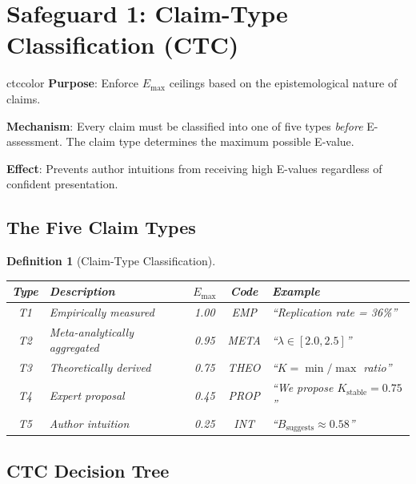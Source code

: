 \documentclass[11pt,a4paper]{article}
\newtheorem{definition}{Definition}[section]
\theoremstyle{remark}
\begin{document}
\section{Safeguard 1: Claim-Type Classification (CTC)}
\label{sec:ctc}

\begin{safeguardbox}{ctccolor}
\textbf{Purpose}: Enforce $E_{\max}$ ceilings based on the epistemological nature of claims.

\textbf{Mechanism}: Every claim must be classified into one of five types \textit{before} E-assessment. The claim type determines the maximum possible E-value.

\textbf{Effect}: Prevents author intuitions from receiving high E-values regardless of confident presentation.
\end{safeguardbox}

\subsection{The Five Claim Types}

\begin{definition}[Claim-Type Classification]
\label{def:ctc}
\begin{center}
\begin{tabular}{clccp{4.5cm}}
\toprule
\textbf{Type} & \textbf{Description} & \textbf{$E_{\max}$} & \textbf{Code} & \textbf{Example} \\
\midrule
T1 & Empirically measured & 1.00 & EMP & ``Replication rate = 36\%'' \\
T2 & Meta-analytically aggregated & 0.95 & META & ``$\lambda \in [2.0, 2.5]$'' \\
T3 & Theoretically derived & 0.75 & THEO & ``$K = \min/\max$ ratio'' \\
T4 & Expert proposal & 0.45 & PROP & ``We propose $K_{\text{stable}} = 0.75$'' \\
T5 & Author intuition & 0.25 & INT & ``$B_{\text{suggests}} \approx 0.58$'' \\
\bottomrule
\end{tabular}
\end{center}
\end{definition}

\subsection{CTC Decision Tree}
\end{document}
